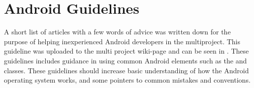 
\section{Android Guidelines}
A short list of articles with a few words of advice was written down for the purpose of helping inexperienced Android developers in the multiproject. This guideline was uploaded to the multi project wiki-page and can be seen in . These guidelines includes guidance in using common Android elements such as the  and  classes. These guidelines should increase basic understanding of how the Android operating system works, and some pointers to common mistakes and conventions.
